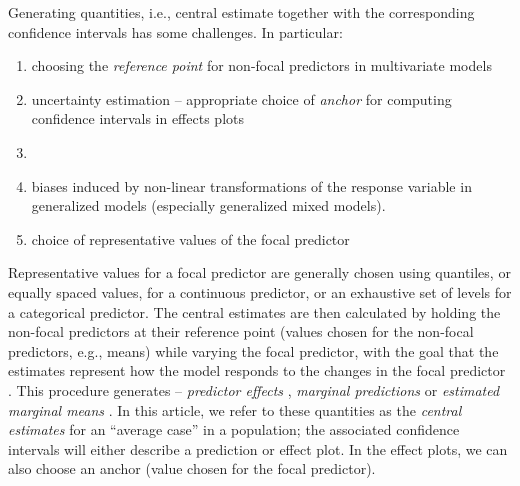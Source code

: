 Generating quantities, i.e., central estimate together with the corresponding confidence intervals has some challenges. In particular:
\begin{enumerate}
\item choosing the \emph{reference point} for non-focal predictors in multivariate models
\item uncertainty estimation -- appropriate choice of \emph{anchor} for computing confidence intervals in effects plots
\item {}
\item biases induced by non-linear transformations of the response variable in generalized models (especially generalized mixed models).
\item choice of representative values of the focal predictor 
\end{enumerate}

Representative values for a focal predictor are generally chosen using quantiles, or equally spaced values, for a continuous predictor, or an exhaustive set of levels for a categorical predictor.
The central estimates are then calculated by holding the non-focal predictors at their reference point (values chosen for the non-focal predictors, e.g., means) while varying the focal predictor, with the goal that the estimates represent how the model responds to the changes in the focal predictor \citep{fox2009effect, hanmer2013behind}. This procedure generates -- \emph{predictor effects} \citep{fox2009effect}, \emph{marginal predictions} \citep{leeper2017package} or \emph{estimated marginal means} \citep{lenth2018package}. In this article, we refer to these quantities as the \emph{central estimates} for an ``average case'' in a population; the associated confidence intervals will either describe a prediction or effect plot. In the effect plots, we can also choose an anchor (value chosen for the focal predictor).


